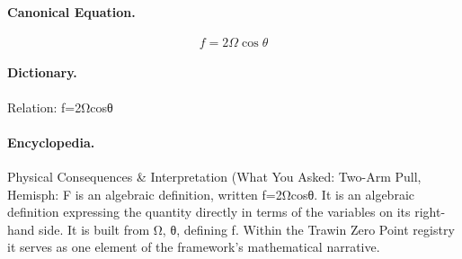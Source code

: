 \paragraph{Canonical Equation.}
\[
f=2\Omega\cos\theta
\]

\paragraph{Dictionary.}
Relation: f=2Ωcosθ

\paragraph{Encyclopedia.}
Physical Consequences \& Interpretation (What You Asked: Two-Arm Pull, Hemisph: F is an algebraic definition, written f=2Ωcosθ. It is an algebraic definition expressing the quantity directly in terms of the variables on its right-hand side. It is built from Ω, θ, defining f. Within the Trawin Zero Point registry it serves as one element of the framework's mathematical narrative.

